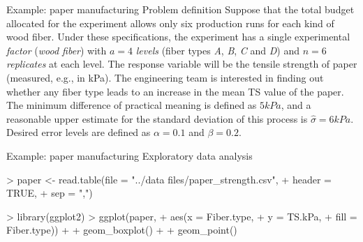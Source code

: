 \documentclass[t]{beamer}
\begin{document}

\begin{ftst}
{Example: paper manufacturing}
{Problem definition}
Suppose that the total budget allocated for the experiment allows only six production runs for each kind of wood fiber.
\vone
Under these specifications, the experiment has a single experimental \textit{factor} (\textit{wood fiber}) with $a = 4$ \textit{levels} (fiber types \textit{A}, \textit{B}, \textit{C} and \textit{D}) and $n = 6$ \textit{replicates} at each level.
\vone
The response variable will be the tensile strength of paper (measured, e.g., in kPa). The engineering team is interested in finding out whether any fiber type leads to an increase in the mean TS value of the paper. 
\vone
The minimum difference of practical meaning is defined as $5 kPa$, and a reasonable upper estimate for the standard deviation of this process is $\hat{\sigma} = 6 kPa$. Desired error levels are defined as $\alpha = 0.1$ and $\beta = 0.2$.
\end{ftst}


\begin{ftstf}
{Example: paper manufacturing}
{Exploratory data analysis}
\begin{rcode}
> paper <- read.table(file   = "../data files/paper_strength.csv", 
+                     header = TRUE, 
+                     sep    = ",")
 
> library(ggplot2)
> ggplot(paper, 
+     aes(x    = Fiber.type,
+         y    = TS.kPa,
+         fill = Fiber.type)) + 
+  geom_boxplot() + 
+  geom_point()

\end{rcode}
\end{ftstf}
\end{document}
